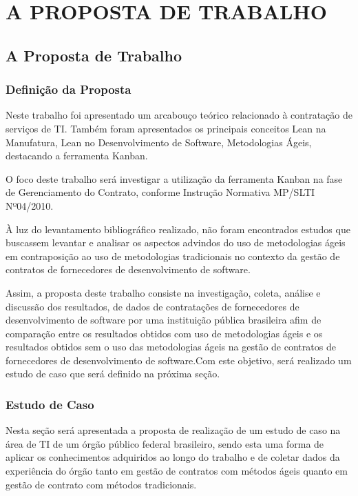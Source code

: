 \part{A PROPOSTA DE TRABALHO}

\chapter[A Proposta de Trabalho]{A Proposta de Trabalho}

\section[Definição da Proposta]{Definição da Proposta}

Neste trabalho foi apresentado um arcabouço teórico relacionado à contratação de serviços de TI. Também foram apresentados os principais conceitos Lean na Manufatura, Lean no Desenvolvimento de Software, Metodologias Ágeis, destacando a ferramenta Kanban.

O foco deste trabalho será investigar a utilização da ferramenta Kanban na fase de Gerenciamento do Contrato, conforme Instrução Normativa MP/SLTI Nº04/2010.

À luz do levantamento bibliográfico realizado, não foram encontrados estudos que buscassem levantar e analisar os aspectos advindos do uso de metodologias ágeis em contraposição ao uso de metodologias tradicionais no contexto da gestão de contratos de fornecedores de desenvolvimento de software.

Assim, a proposta deste trabalho consiste na investigação, coleta, análise e discussão dos resultados, de dados de contratações de fornecedores de desenvolvimento de software por uma instituição pública brasileira afim de comparação entre os resultados obtidos com uso de metodologias ágeis e os resultados obtidos sem o uso das metodologias ágeis na gestão de contratos de fornecedores de desenvolvimento de software.Com este objetivo, será realizado um estudo de caso que será definido na próxima seção.


\section[Estudo de Caso]{Estudo de Caso}

Nesta seção será apresentada a proposta de realização de um estudo de caso na área de TI de um órgão público federal brasileiro, sendo esta uma forma de aplicar os conhecimentos adquiridos ao longo do trabalho e de coletar dados da experiência do órgão tanto em gestão de contratos com métodos ágeis quanto em gestão de contrato com métodos tradicionais.

